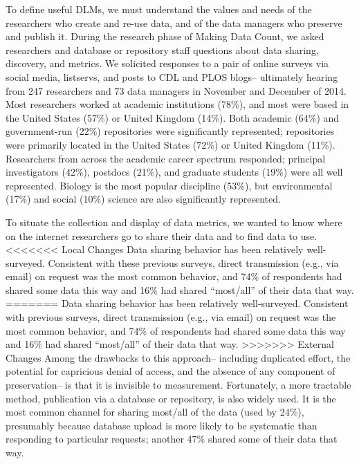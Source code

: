 \documentclass[english]{article}
\begin{document}

To define useful DLMs, we must understand the values and needs of the researchers who create and re-use data, and of the data managers who preserve and publish it.
During the research phase of Making Data Count, we asked researchers and database or repository staff questions about data sharing, discovery, and metrics.
We solicited responses to a pair of online surveys via social media, listservs, and posts to CDL and PLOS blogs-- ultimately hearing from 247 researchers and 73 data managers in November and December of 2014.
Most researchers worked at academic institutions (78\%), and most were based in the United States (57\%) or United Kingdom (14\%).
Both academic (64\%) and government-run (22\%) repositories were significantly represented; repositories were primarily located in the United States (72\%) or United Kingdom (11\%).
Researchers from across the academic career spectrum responded; principal investigators (42\%), postdocs (21\%), and graduate students (19\%) were all well represented. 
Biology is the most popular discipline (53\%), but environmental (17\%) and social (10\%) science are also significantly represented. 


To situate the collection and display of data metrics, we wanted to know where on the internet researchers go to share their data and to find data to use. 
<<<<<<< Local Changes
Data sharing behavior has been relatively well-surveyed\cite{tenopir_data_2011, akers_disciplinary_2013, wallis_if_2013, aydinoglu_data_2014, kratz_researcher_2015}. 
Consistent with these previous surveys, direct transmission (e.g., via email) on request was the most common behavior, and 74\% of respondents had shared some data this way and 16\% had shared ``most/all'' of their data that way.
=======
Data sharing behavior has been relatively well-surveyed\cite{@tenopir_data_2011, @akers_disciplinary_2013, @wallis_if_2013, @aydinoglu_data_2014, @kratz_researcher_2015}. 
Consistent with previous surveys, direct transmission (e.g., via email) on request was the most common behavior, and 74\% of respondents had shared some data this way and 16\% had shared ``most/all'' of their data that way.
>>>>>>> External Changes
Among the drawbacks to this approach-- including duplicated effort, the potential for capricious denial of access, and the absence of any component of preservation-- is that it is invisible to measurement. 
Fortunately, a more tractable method, publication via a database or repository, is also widely used.
It is the most common channel for sharing most/all of the data (used by 24\%), presumably because database upload is more likely to be systematic than responding to particular requests; another 47\% shared some of their data that way.
\end{document}
